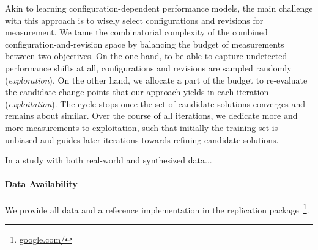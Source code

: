 \documentclass[utf8,biblatex]{lni}
\begin{document}
Akin to learning configuration-dependent performance models, the main challenge with this approach is to wisely select configurations and revisions for measurement. We tame the combinatorial complexity of the combined configuration-and-revision space by balancing the budget of measurements between two objectives. On the one hand, to be able to capture undetected performance shifts at all, configurations and revisions are sampled randomly (\textit{exploration}). On the other hand, we allocate a part of the budget to re-evaluate the candidate change points that our approach yields in each iteration (\textit{exploitation}). The cycle stops once the set of candidate solutions converges and remains about similar. Over the course of all iterations, we dedicate more and more measurements to exploitation, such that initially the training set is unbiased and guides later iterations towards refining candidate solutions.



In a study with both real-world and synthesized data...

{
\paragraph{Data Availability} 
\color{red}
We provide all data and a reference implementation in the replication package~\footnote{\url{google.com/}}.
}
\vfill
\printbibliography
\end{document}
